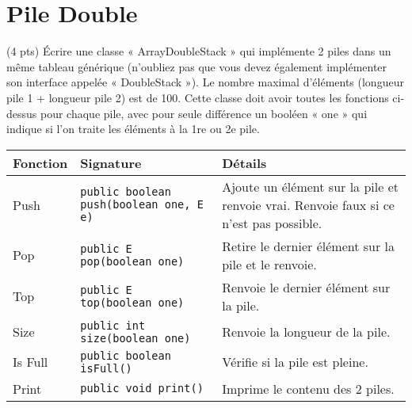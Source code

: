 \documentclass[10pt]{report}
\begin{document}
    \chapter{Pile Double}
    \vspace{-2em}

    \begin{Exercice}{(4 pts)}{}
        Écrire une classe « ArrayDoubleStack » qui implémente 2 piles
        dans un même tableau générique (n’oubliez
        pas que vous devez également implémenter son interface appelée 
        « DoubleStack »). Le nombre maximal d'éléments (longueur pile 1 + 
        longueur pile 2) est de 100.
        Cette classe doit avoir toutes les fonctions ci-dessus pour chaque pile,
        avec pour seule différence un
        booléen « one » qui indique si l'on traite les éléments à la 1re
        ou 2e pile.       
    \end{Exercice}


  \begin{table}[H]

    \begin{center}
      \renewcommand{\arraystretch}{1.5}
      \selectfont
      \footnotesize
          \begin{tabular}{p{2cm} p{3cm} p{4cm}}
          \arrayrulecolor{blue}\hline
          \rowcolor{draculawhite-background}
          \textcolor{myb}{Fonction} & 
          \textcolor{myb}{Signature} & 
          \textcolor{myb}{Détails}  
          \\
          \hline
          \arrayrulecolor{black}
          Push   & 
          \texttt{public boolean push(boolean one, E e)}  
                 &
          Ajoute un élément sur la pile et 
          renvoie vrai. Renvoie faux si ce n'est pas possible.
          \\
          \hline
          Pop   &  
          \texttt{public E pop(boolean one)}  
                &
          Retire le dernier élément sur la pile et le renvoie.
          \\
          \hline
          Top  &
          \texttt{public E top(boolean one)} 
               &
          Renvoie le dernier élément sur la pile.
          \\ 
          \hline
          Size & 
          \texttt{public int size(boolean one)}  
               &
          Renvoie la longueur de la pile.
          \\
          \hline 
          Is Full & 
          \texttt{public boolean isFull()}  
                   &
          Vérifie si la pile est pleine.
          \\
          \hline 
          Print & 
          \texttt{public void print()}  
                    &
          Imprime le contenu des 2 piles.
          \\ 
          \hline
          \end{tabular}
  \end{center}
  \end{table}
\end{document}
